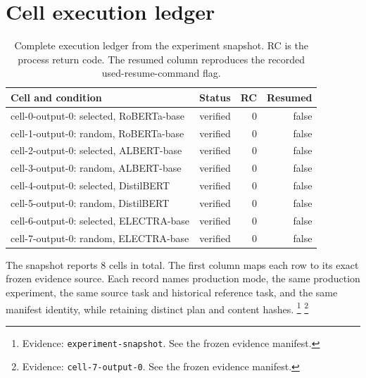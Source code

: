\documentclass[10pt,twocolumn,letterpaper]{article}
\begin{document}
\section{Cell execution ledger}\label{cell-ledger}
\begin{table}[H]\centering\normalsize
\caption{Complete execution ledger from the experiment snapshot. RC is the process return code. The resumed column reproduces the recorded used-resume-command flag.}
\begin{tabularx}{\textwidth}{@{}Xrrr@{}}
\toprule
Cell and condition & Status & RC & Resumed \\ \midrule
cell-0-output-0: selected, RoBERTa-base & verified & 0 & false \\
cell-1-output-0: random, RoBERTa-base & verified & 0 & false \\
cell-2-output-0: selected, ALBERT-base & verified & 0 & false \\
cell-3-output-0: random, ALBERT-base & verified & 0 & false \\
cell-4-output-0: selected, DistilBERT & verified & 0 & false \\
cell-5-output-0: random, DistilBERT & verified & 0 & false \\
cell-6-output-0: selected, ELECTRA-base & verified & 0 & false \\
cell-7-output-0: random, ELECTRA-base & verified & 0 & false \\
\bottomrule\end{tabularx}\end{table}
The snapshot reports 8 cells in total. The first column maps each row to its exact frozen evidence source. Each record names production mode, the same production experiment, the same source task and historical reference task, and the same manifest identity, while retaining distinct plan and content hashes. \footnote{Evidence: \texttt{experiment-snapshot}. See the frozen evidence manifest.} \footnote{Evidence: \texttt{cell-7-output-0}. See the frozen evidence manifest.}
\end{document}
